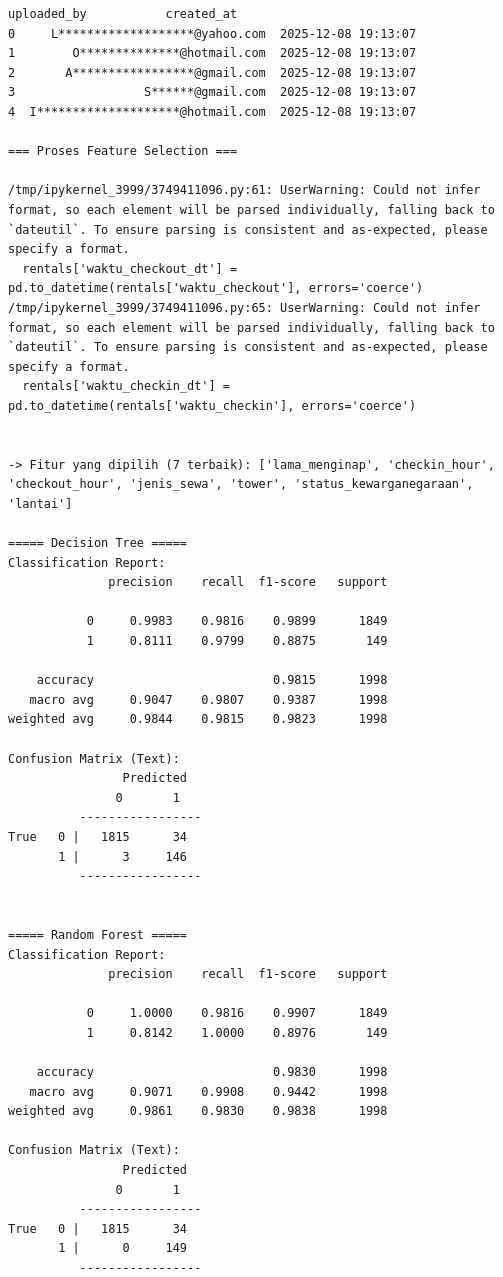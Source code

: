 \begin{lstlisting}[caption={Output 10}]
                         uploaded_by           created_at  
0     L*******************@yahoo.com  2025-12-08 19:13:07  
1        O**************@hotmail.com  2025-12-08 19:13:07  
2       A*****************@gmail.com  2025-12-08 19:13:07  
3                  S******@gmail.com  2025-12-08 19:13:07  
4  I********************@hotmail.com  2025-12-08 19:13:07  

=== Proses Feature Selection ===

/tmp/ipykernel_3999/3749411096.py:61: UserWarning: Could not infer format, so each element will be parsed individually, falling back to `dateutil`. To ensure parsing is consistent and as-expected, please specify a format.
  rentals['waktu_checkout_dt'] = pd.to_datetime(rentals['waktu_checkout'], errors='coerce')
/tmp/ipykernel_3999/3749411096.py:65: UserWarning: Could not infer format, so each element will be parsed individually, falling back to `dateutil`. To ensure parsing is consistent and as-expected, please specify a format.
  rentals['waktu_checkin_dt'] = pd.to_datetime(rentals['waktu_checkin'], errors='coerce')


-> Fitur yang dipilih (7 terbaik): ['lama_menginap', 'checkin_hour', 'checkout_hour', 'jenis_sewa', 'tower', 'status_kewarganegaraan', 'lantai']

===== Decision Tree =====
Classification Report:
              precision    recall  f1-score   support

           0     0.9983    0.9816    0.9899      1849
           1     0.8111    0.9799    0.8875       149

    accuracy                         0.9815      1998
   macro avg     0.9047    0.9807    0.9387      1998
weighted avg     0.9844    0.9815    0.9823      1998

Confusion Matrix (Text):
                Predicted
               0       1
          -----------------
True   0 |   1815      34
       1 |      3     146
          -----------------


===== Random Forest =====
Classification Report:
              precision    recall  f1-score   support

           0     1.0000    0.9816    0.9907      1849
           1     0.8142    1.0000    0.8976       149

    accuracy                         0.9830      1998
   macro avg     0.9071    0.9908    0.9442      1998
weighted avg     0.9861    0.9830    0.9838      1998

Confusion Matrix (Text):
                Predicted
               0       1
          -----------------
True   0 |   1815      34
       1 |      0     149
          -----------------



\end{lstlisting}
